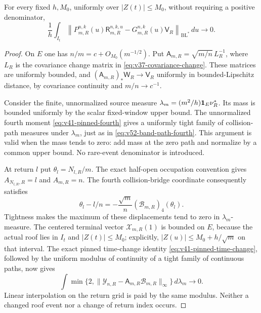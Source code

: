 \begin{lemma}
\label{lem:v52-return-transfer}
For every fixed $h,M_0$, uniformly over $|Z(t)|\le M_0$, without
requiring a positive denominator,
\begin{equation}\label{eq:v52-return-path-variation}
 \frac1h\int_{I_t}
 \left\|P_{m,R}^{n,k}(u)\mathsf R_{m,R}^{n,k,u}
                  -G_{m,R}^{n,k}(u)\mathsf V_R\right\|_{\mathrm{BL}^*}
                                                       \,du\longrightarrow0.
\end{equation}
\end{lemma}
\begin{proof}
On $E$ one has $n/m=c+O_{M_0}(m^{-1/2})$. Put
$\mathsf A_{m,R}=\sqrt{m/n}\,L_R^{-1}$, where $L_R$ is the covariance change
matrix in \eqref{eq:v37-covariance-change}. These matrices are uniformly
bounded, and
$(\mathsf A_{m,R})_*\mathsf W_R\to\mathsf V_R$ uniformly in bounded-Lipschitz
distance, by covariance continuity and $m/n\to c^{-1}$.

Consider the finite, unnormalized source measure
$\lambda_m=(m^2/h)\mathbf1_E\nu_R^*$. Its mass is bounded uniformly by
the scalar fixed-window upper bound. The unnormalized fourth moment
\eqref{eq:v41-pinned-fourth} gives a uniformly tight family of
collision-path measures under $\lambda_m$, just as in
\eqref{eq:v52-band-path-fourth}. This argument is valid when the
mass tends to zero: add mass at the zero path and normalize by a
common upper bound. No rare-event denominator is introduced.

At return $l$ put $\theta_l=N_{l,R}/m$. The exact half-open
occupation convention gives $A_{N_{l,R},R}=l$ and $A_{m,R}=n$.
The fourth collision-bridge coordinate consequently satisfies
\begin{equation}\label{eq:v52-exact-clock-displacement}
 \theta_l-l/n=-\frac{\sqrt m}{n}
                  (\mathcal B_{m,R})_4(\theta_l).
\end{equation}
Tightness makes the maximum of these displacements tend to zero in
$\lambda_m$-measure. The centered terminal vector
$\mathcal X_{m,R}(1)$ is bounded on $E$, because the actual roof lies
in $I_t$ and $|Z(t)|\le M_0$; explicitly,
$|Z(u)|\le M_0+h/\sqrt m$ on that interval. The exact pinned time-change identity
\eqref{eq:v41-pinned-time-change}, followed by the uniform modulus
of continuity of a tight family of continuous paths, now gives
\begin{equation}\label{eq:v52-clock-coupling}
 \int \min\{2,\|\mathcal Y_{n,R}-\mathsf A_{m,R}\mathcal B_{m,R}\|_\infty\}
                                                     \,d\lambda_m\to0.
\end{equation}
Linear interpolation on the return grid is paid by the same modulus.
Neither a changed roof event nor a change of return index occurs.


\end{proof}
